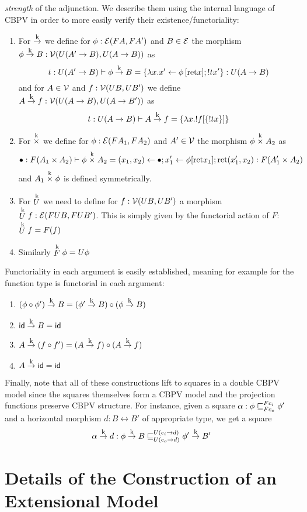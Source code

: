\emph{strength} of the adjunction. We describe them using the internal
language of CBPV in order to more easily verify their
existence/functoriality:
\begin{enumerate}
\item For $\tok$ we define for $\phi : \calE(F A,F A')$ and $B \in \calE$ the morphism $\phi \tok B : \calV(U(A' \to B),U(A\to B))$ as
  \[ t:U(A'\to B) \vdash \phi \tok B = \{ \lambda x. x' \leftarrow \phi\,[\ret x]; ! t x'\} : U(A \to B) \]
  and for $A \in \calV$ and $f : \calV(UB,UB')$ we define $A \tok f : \calV(U(A \to B),U(A\to B'))$ as
  \[ t : U(A \to B) \vdash A \tok f = \{ \lambda x. !f[\{ ! t x \}]\} \]
\item For $\timesk$ we define for $\phi : \calE(F A_1,FA_2)$ and $A' \in \calV$ the morphism $\phi \timesk A_2$ as
  \[ \bullet : F(A_1\times A_2) \vdash \phi \timesk A_2 = (x_1,x_2) \leftarrow \bullet; x_1' \leftarrow \phi[\ret x_1]; \ret (x_1',x_2) : F(A_1'\times A_2)\]
  and $A_1 \timesk \phi$ is defined symmetrically.
\item For $\Uk$ we need to define for $f : \calV(UB,UB')$ a morphism $\Uk f : \calE(FUB,FUB')$. This is simply given by the functorial action of $F$: $\Uk f = F(f)$
\item Similarly $\Fk \phi = U\phi$
\end{enumerate}

Functoriality in each argument is easily established, meaning for
example for the function type is functorial in each argument:
\begin{enumerate}
\item $(\phi \circ \phi') \tok B = (\phi' \tok B) \circ (\phi \tok B)$
\item $\id \tok B = \id$
\item $A \tok (f \circ f') = (A \tok f) \circ (A \tok f)$
\item $A \tok \id = \id$
\end{enumerate}

Finally, note that all of these constructions lift to squares in a
double CBPV model since the squares themselves form a CBPV model and
the projection functions preserve CBPV structure. For instance, given a square
$\alpha : \phi \ltdyn_{F c_o}^{F c_i} \phi'$ and a horizontal morphism $d : B \rel B'$ of appropriate type, we get a square
\[ \alpha \tok d : \phi \tok B \ltdyn_{U(c_o \to d)}^{U(c_i \to d)} \phi' \tok B' \]

\section{Details of the Construction of an Extensional Model}


